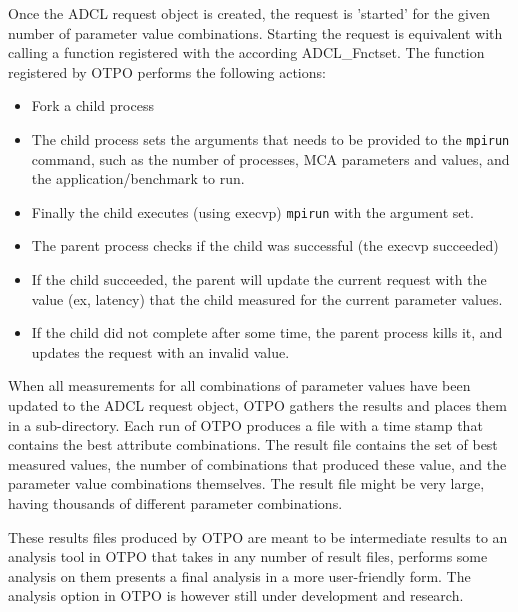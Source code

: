 Once the ADCL request object is created, the request is 'started' for the given number of parameter value combinations.
Starting the request is equivalent with calling a function registered with the according ADCL\_Fnctset. The function registered by OTPO performs the following actions:
\begin{itemize}
\item Fork a child process
\item The child process sets the arguments that needs to be provided to the {\tt mpirun}
  command, such as the number of processes, MCA parameters and values, and the application/benchmark to run.
\item Finally the child executes (using execvp) {\tt mpirun} with the argument
  set.
\item The parent process checks if the child was successful (the execvp succeeded)
\item If the child succeeded, the parent will update the current request with
  the value (ex, latency) that the child measured for the current parameter values.
\item If the child did not complete after some time, the parent process kills it, and
  updates the request with an invalid value.
\end{itemize}

When all measurements for all combinations of parameter values have been updated to the ADCL request object, 
OTPO gathers the results and places them in a sub-directory. Each run of OTPO produces a
file with a time stamp that contains the best attribute combinations. The
result file contains the set of best measured values, the number of combinations that
produced these value, and the parameter value combinations themselves. The result file might be very large,
having thousands of different parameter combinations. 

These results files produced by OTPO are meant to be intermediate results to
an analysis tool in OTPO that takes in any number of result files, performs some
analysis on them presents a final analysis in a more user-friendly form. The analysis
option in OTPO is however still under development and research.

